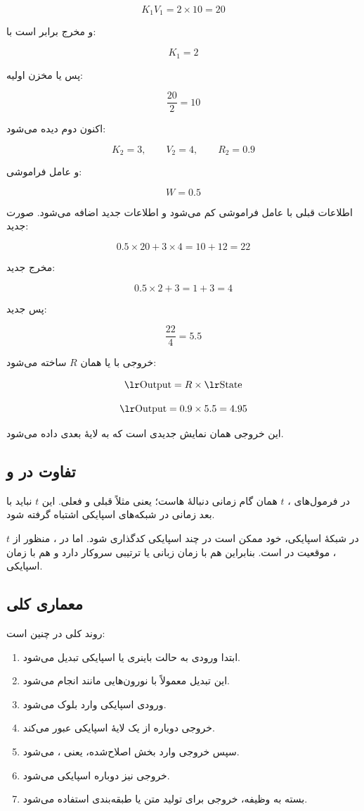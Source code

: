 \[
K_1V_1 = 2 \times 10 = 20
\]

و مخرج برابر است با:

\[
K_1 = 2
\]

پس  یا مخزن اولیه:

\[
\frac{20}{2} = 10
\]

اکنون  دوم دیده می‌شود:

\[
K_2 = 3,\qquad V_2 = 4,\qquad R_2 = 0.9
\]

و عامل فراموشی:

\[
W = 0.5
\]

اطلاعات قبلی با عامل فراموشی کم می‌شود و اطلاعات جدید اضافه می‌شود. صورت جدید:

\[
0.5 \times 20 + 3 \times 4 = 10 + 12 = 22
\]

مخرج جدید:

\[
0.5 \times 2 + 3 = 1 + 3 = 4
\]

پس  جدید:

\[
\frac{22}{4} = 5.5
\]

خروجی با  یا همان \(R\) ساخته می‌شود:

\[
\text{\eng{Output}} = R \times \text{\eng{State}}
\]

\[
\text{\eng{Output}} = 0.9 \times 5.5 = 4.95
\]

این خروجی همان نمایش جدیدی است که به لایهٔ بعدی داده می‌شود.

\subsection{تفاوت  در  و }
در فرمول‌های ، \(t\) همان گام زمانی دنبالهٔ هاست؛ یعنی مثلاً  قبلی و  فعلی. این \(t\) نباید با بعد زمانی در شبکه‌های اسپایکی اشتباه گرفته شود.

در شبکهٔ اسپایکی، خود  ممکن است در چند  اسپایکی کدگذاری شود. اما در ، منظور از \(t\)، موقعیت  در  است. بنابراین  هم با زمان زبانی یا ترتیبی سروکار دارد و هم با زمان اسپایکی.

\subsection{معماری کلی }
روند کلی در  چنین است:

\begin{enumerate}
  \item ابتدا  ورودی به حالت باینری یا اسپایکی تبدیل می‌شود.
  \item این تبدیل معمولاً با نورون‌هایی مانند  انجام می‌شود.
  \item ورودی اسپایکی وارد بلوک  می‌شود.
  \item خروجی  دوباره از یک لایهٔ اسپایکی عبور می‌کند.
  \item سپس خروجی وارد بخش  اصلاح‌شده، یعنی ، می‌شود.
  \item خروجی  نیز دوباره اسپایکی می‌شود.
  \item بسته به وظیفه، خروجی برای تولید متن یا طبقه‌بندی استفاده می‌شود.
\end{enumerate}

